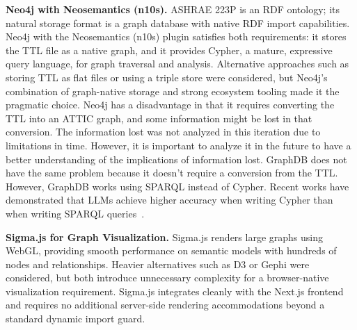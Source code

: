\textbf{Neo4j with Neosemantics (n10s).}
ASHRAE 223P is an RDF ontology; its natural storage format is a graph database with
native RDF import capabilities. Neo4j with the Neosemantics (n10s) plugin satisfies both
requirements: it stores the TTL file as a native graph, and it provides Cypher, a
mature, expressive query language, for graph traversal and analysis. Alternative
approaches such as storing TTL as flat files or using a triple store were considered, but
Neo4j's combination of graph-native storage and strong ecosystem tooling made it the
pragmatic choice. Neo4j has a disadvantage in that it requires converting the TTL into an ATTIC graph, and some information might be lost in that conversion.
The information lost was not analyzed in this iteration due to limitations in time. However, it is important to analyze it in the future to have a better understanding of the implications of information lost.
GraphDB does not have the same problem because it doesn't require a conversion from the TTL. 
However, GraphDB works using SPARQL instead of Cypher. 
Recent works have demonstrated that LLMs achieve higher accuracy when writing Cypher than when writing SPARQL queries~\cite{Sivasubramaniam2024}.


\textbf{Sigma.js for Graph Visualization.}
Sigma.js renders large graphs using WebGL, providing smooth performance on semantic models
with hundreds of nodes and relationships. Heavier alternatives such as D3 or Gephi were
considered, but both introduce unnecessary complexity for a browser-native visualization
requirement. Sigma.js integrates cleanly with the Next.js frontend and requires no
additional server-side rendering accommodations beyond a standard dynamic import guard.
